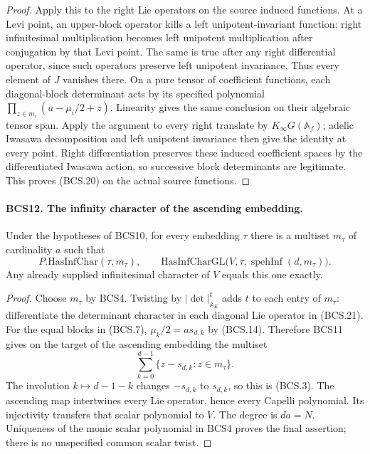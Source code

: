 \documentclass[11pt,a4paper]{article}
\numberwithin{equation}{section}
\theoremstyle{remark}\newtheorem{remark}[theorem]{Remark}
\begin{document}
\begin{proof}
Apply this to the right Lie operators on the source induced
functions.  At a Levi point, an upper-block operator kills a left
unipotent-invariant function: right infinitesimal multiplication
becomes left unipotent multiplication after conjugation by that
Levi point.  The same is true after any right differential operator,
since such operators preserve left unipotent invariance.  Thus every
element of \(J\) vanishes there.  On a pure tensor of coefficient
functions, each diagonal-block determinant acts by its specified
polynomial \(\prod_{z\in m_i}(u-\mu_i/2+z)\).  Linearity gives
the same conclusion on their algebraic tensor span.  Apply the
argument to every right translate by \(K_\infty G(\mathbb A_f)\);
adelic Iwasawa decomposition and left unipotent invariance then give
the identity at every point.  Right differentiation preserves these
induced coefficient spaces by the differentiated Iwasawa action,
so successive block determinants are legitimate.  This proves
(BCS.20) on the actual source functions.
\end{proof}

\paragraph{BCS12. The infinity character of the ascending embedding.}
\label{claim:BCS12}
Under the hypotheses of BCS10, for every embedding \(\tau\) there
is a multiset \(m_\tau\) of cardinality \(a\) such that
\[
 P.\mathrm{HasInfChar}(\tau,m_\tau),\qquad
 \mathrm{HasInfCharGL}\bigl(V,\tau,
                    \operatorname{spehInf}(d,m_\tau)\bigr).
 \tag{BCS.24}
\]
Any already supplied infinitesimal character of \(V\) equals this
one exactly.
\begin{proof}
Choose \(m_\tau\) by BCS4.  Twisting by
\(|\det|_{\mathbb A_E}^{t}\) adds \(t\) to each entry of
\(m_\tau\): differentiate the determinant character in each
diagonal Lie operator in (BCS.21).  For the equal blocks in (BCS.7),
\(\mu_k/2=a s_{d,k}\) by (BCS.14).  Therefore BCS11 gives on
the target of the ascending embedding the multiset
\[
             \sum_{k=0}^{d-1}\{z-s_{d,k}:z\in m_\tau\}.
\]
The involution \(k\mapsto d-1-k\) changes \(-s_{d,k}\) to
\(s_{d,k}\), so this is (BCS.3).  The ascending map intertwines
every Lie operator, hence every Capelli polynomial.  Its injectivity
transfers that scalar polynomial to \(V\).  The degree is
\(da=N\).  Uniqueness of the monic scalar polynomial in BCS4 proves
the final assertion; there is no unspecified common scalar twist.
\end{proof}
\end{document}
